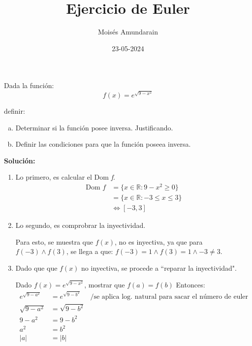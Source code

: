 \documentclass[12pt]{article}
\begin{document}
\author{Moisés Amundarain}
\title{Ejercicio de Euler}
\date{23-05-2024}
\maketitle
Dada la función: 
\begin{equation*}
f(x)= e^{\sqrt{9-x^{2}}}
\end{equation*}

definir: 
\begin{enumerate}[a),leftmargin=2cm]	
\item Determinar si la función posee inversa. Justificando.
\item Definir las condiciones para que la función poseea inversa.
\end{enumerate}
\textbf{Solución:} 
\begin{enumerate}
	\item Lo primero, es calcular el Dom \emph{f}.
		\begin{align*}
			\text{Dom } f & = \{ x \in \mathbb{R}
 : 9-x^{2} \geq 0 \} \\ 
			& = \{ x \in \mathbb{R}
 : -3 \leq x \leq 3 \} \\ 
			& \iff [-3,3]	
			\end{align*}
	\item Lo segundo, es comprobrar la inyectividad. 
	
	Para esto, se muestra que $f(x)$, no es inyectiva, ya que para $f(-3) \land f(3)$, se llega a que: $f(-3)=1 \land f(3)=1 \land -3 \ne 3$. 
	\item Dado que que $f(x)$ no inyectiva, se procede a ``reparar la inyectividad".
	
	Dado $f(x) = e^{\sqrt{9-x^2}}$, mostrar que $f(a)=f(b)$
\newpage
	Entonces: 
		\begin{align*}
			e^{\sqrt{9-a^2}} &= e^{\sqrt{9-b^2}} & \mbox{/se aplica log. natural para sacar el número de euler}\\
			\sqrt{9-a^{2}} &= \sqrt{9-b^{2}} \\
			9-a^{2} &= 9-b^{2} \\
			a^2 &= b^2 \\
			|a| &= |b|\\		
		\end{align*}
\end{enumerate}
\end{document}
